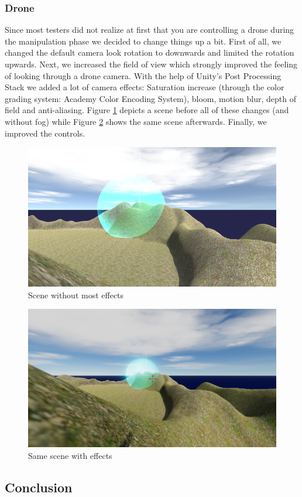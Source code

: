 \documentclass[12pt, letterpaper]{scrartcl}
\begin{document}
	\subsubsection{Drone}
	Since most testers did not realize at first that you are controlling a drone during the manipulation phase we decided to change things up a bit. First of all, we changed the default camera look rotation to downwards and limited the rotation upwards. Next, we increased the field of view which strongly improved the feeling of looking through a drone camera. With the help of Unity's Post Processing Stack we added a lot of camera effects: Saturation increase (through the color grading system: Academy Color Encoding System), bloom, motion blur, depth of field and anti-aliasing. Figure \ref{fig:sceneWithoutEffects} depicts a scene before all of these changes (and without fog) while Figure \ref{fig:sceneWithEffects} shows the same scene afterwards. Finally, we improved the controls.
	\begin{figure}[H]
		\centering
		\includegraphics[width=\textwidth-4cm]{images/final/DroneEffects1}
		\caption{Scene without most effects}
		\label{fig:sceneWithoutEffects}
	\end{figure}
	\begin{figure}[H]
		\centering
		\includegraphics[width=\textwidth-4cm]{images/final/DroneEffects2}
		\caption{Same scene with effects}
		\label{fig:sceneWithEffects}
	\end{figure}
	
	\subsection{Conclusion}
	 
\end{document}
